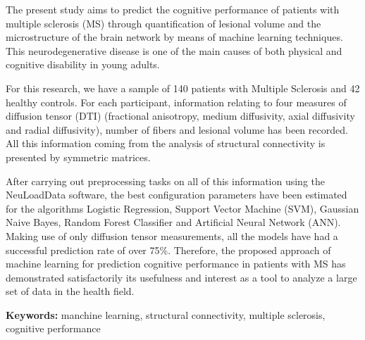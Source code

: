 \vspace*{1cm}
The present study aims to predict the cognitive performance of patients with multiple sclerosis (MS) through quantification of lesional volume and the microstructure of the brain network by means of machine learning techniques. This neurodegenerative disease is one of the main causes of both physical and cognitive disability in young adults.

For this research, we have a sample of 140 patients with Multiple Sclerosis and 42 healthy controls. For each participant, information relating to four measures of diffusion tensor (DTI) (fractional anisotropy, medium diffusivity, axial diffusivity and radial diffusivity), number of fibers and lesional volume has been recorded. All this information coming from the analysis of structural connectivity is presented by symmetric matrices.

After carrying out preprocessing tasks on all of this information using the NeuLoadData software, the best configuration parameters have been estimated for the algorithms Logistic Regression, Support Vector Machine (SVM), Gaussian Naive Bayes, Random Forest Classifier and Artificial Neural Network (ANN). Making use of only diffusion tensor measurements, all the models have had a successful prediction rate of over 75\%. Therefore, the proposed approach of machine learning for prediction cognitive performance in patients with MS has demonstrated satisfactorily its usefulness and interest as a tool to analyze a large set of data in the health field.

\textbf{Keywords:} manchine learning, structural connectivity, multiple sclerosis, cognitive performance